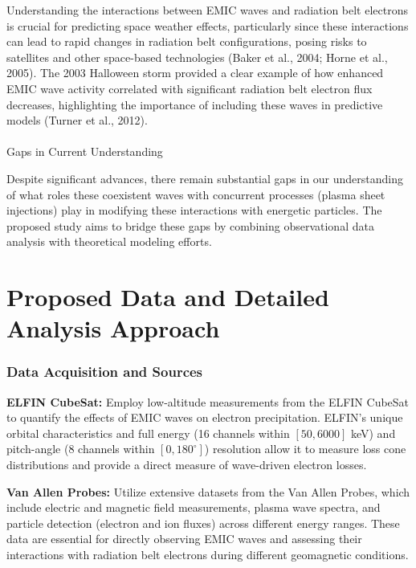 \documentclass[
  letterpaper,
  DIV=11,
  numbers=noendperiod]{scrartcl}
\makeatletter
\let\oldparagraph\paragraph
\renewcommand{\paragraph}{
    \@ifstar
      \xxxParagraphStar
      \xxxParagraphNoStar
  }
\newcommand{\xxxParagraphStar}[1]{\oldparagraph*{#1}\mbox{}}
\newcommand{\xxxParagraphNoStar}[1]{\oldparagraph{#1}\mbox{}}
\makeatother
\begin{document}
Understanding the interactions between EMIC waves and radiation belt electrons is crucial for predicting space weather effects, particularly since these interactions can lead to rapid changes in radiation belt configurations, posing risks to satellites and other space-based technologies (Baker et al., 2004; Horne et al., 2005). The 2003 Halloween storm provided a clear example of how enhanced EMIC wave activity correlated with significant radiation belt electron flux decreases, highlighting the importance of including these waves in predictive models (Turner et al., 2012).

\paragraph{Gaps in Current Understanding}\label{gaps-in-current-understanding}

Despite significant advances, there remain substantial gaps in our understanding of what roles these coexistent waves with concurrent processes (plasma sheet injections) play in modifying these interactions with energetic particles. The proposed study aims to bridge these gaps by combining observational data analysis with theoretical modeling efforts.

\section{Proposed Data and Detailed Analysis Approach}\label{proposed-data-and-detailed-analysis-approach}

\subsubsection{Data Acquisition and Sources}\label{data-acquisition-and-sources}

\textbf{ELFIN CubeSat:} Employ low-altitude measurements from the ELFIN CubeSat to quantify the effects of EMIC waves on electron precipitation. ELFIN's unique orbital characteristics and full energy (16 channels within \([50,6000]\) keV) and pitch-angle (8 channels within \([0,180^\circ]\)) resolution allow it to measure loss cone distributions and provide a direct measure of wave-driven electron losses.

\textbf{Van Allen Probes:} Utilize extensive datasets from the Van Allen Probes, which include electric and magnetic field measurements, plasma wave spectra, and particle detection (electron and ion fluxes) across different energy ranges. These data are essential for directly observing EMIC waves and assessing their interactions with radiation belt electrons during different geomagnetic conditions.
\end{document}
